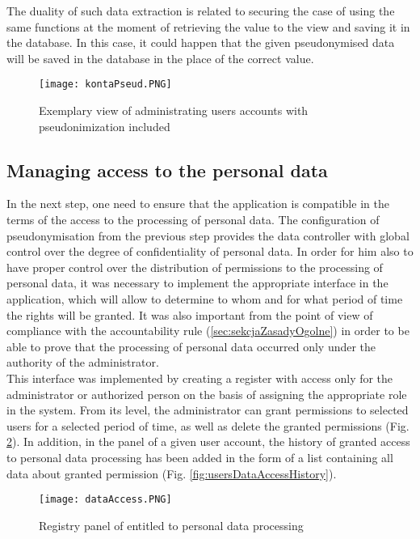 \documentclass[en, noamssymb]{mgr}
\begin{document}
The duality of such data extraction is related to securing the case of using the same functions at the moment of retrieving the value to the view and saving it in the database. In this case, it could happen that the given pseudonymised data will be saved in the database in the place of the correct value.

\begin{figure}[H]
	\centering
	\texttt{[image: kontaPseud.PNG]}
	\caption[Exemplary view of administrating users accounts with pseudonimization included]{Exemplary view of administrating users accounts with pseudonimization included}
	\label{fig:accountsAdministrationPseudonimized}
\end{figure}

\subsection{Managing access to the personal data}

In the next step, one need to ensure that the application is compatible in the terms of the access to the processing of personal data. The configuration of pseudonymisation from the previous step provides the data controller with global control over the degree of confidentiality of personal data. In order for him also to have proper control over the distribution of permissions to the processing of personal data, it was necessary to implement the appropriate interface in the application, which will allow to determine to whom and for what period of time the rights will be granted. It was also important from the point of view of compliance with the accountability rule (\ref{sec:sekcjaZasadyOgolne}) in order to be able to prove that the processing of personal data occurred only under the authority of the administrator.\\
\indent This interface was implemented by creating a register with access only for the administrator or authorized person on the basis of assigning the appropriate role in the system. From its level, the administrator can grant permissions to selected users for a selected period of time, as well as delete the granted permissions (Fig. \ref{fig:dataAccessPanel}). In addition, in the panel of a given user account, the history of granted access to personal data processing has been added in the form of a list containing all data about granted permission (Fig. \ref{fig:usersDataAccessHistory}).

\begin{figure}[H]
	\centering
	\texttt{[image: dataAccess.PNG]}
	\caption[Registry panel of entitled to personal data processing]{Registry panel of entitled to personal data processing}
	\label{fig:dataAccessPanel}
\end{figure}
\end{document}
